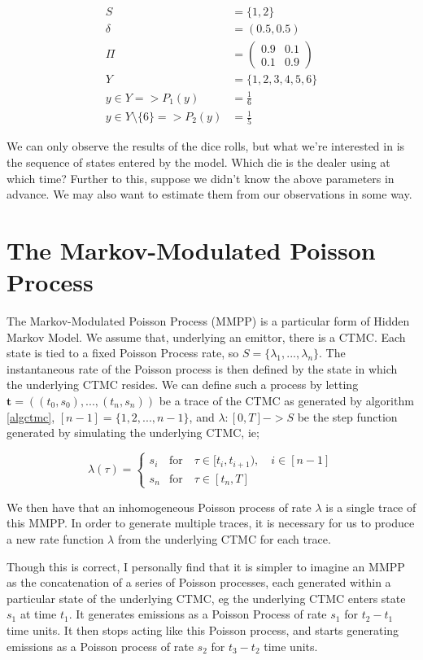 \begin{align*}
S &= \{1,2\}\\
\delta &= (0.5,0.5)\\
\Pi &= 
\left(
	\begin{matrix}
	0.9 & 0.1 \\
	0.1 & 0.9
	\end{matrix}
\right)\\
Y &= \{1,2,3,4,5,6\}\\
y \in Y => P_1(y) &= \frac{1}{6}\\
y \in Y \setminus \{6\} => P_2(y) &= \frac{1}{5}
\end{align*}

We can only observe the results of the dice rolls, but what we're interested in is the sequence of states entered by the model. Which die is the dealer using at which time? Further to this, suppose we didn't know the above parameters in advance. We may also want to estimate them from our observations in some way.

\section{The Markov-Modulated Poisson Process}\label{mmppdef}

The Markov-Modulated Poisson Process (MMPP) is a particular form of Hidden Markov Model. We assume that, underlying an emittor, there is a CTMC. Each state is tied to a fixed Poisson Process rate, so $S = \{\lambda_1,...,\lambda_n\}$. The instantaneous rate of the Poisson process is then defined by the state in which the underlying CTMC resides. We can define such a process by letting $\mathbf{t} = ((t_0,s_0),...,(t_n,s_n))$ be a trace of the CTMC as generated by algorithm \ref{algctmc}, $[n-1] = \{1,2,...,n-1\}$, and $\lambda : [0,T]->S$ be the step function generated by simulating the underlying CTMC, ie;

$$
\lambda(\tau) = 
\begin{cases}
	s_i & \mbox{for} \quad \tau \in [t_i,t_{i+1}), \quad i \in [n-1]\\
	s_n & \mbox{for} \quad \tau \in [t_n,T]
\end{cases}
$$

We then have that an inhomogeneous Poisson process of rate $\lambda$ is a single trace of this MMPP. In order to generate multiple traces, it is necessary for us to produce a new rate function $\lambda$ from the underlying CTMC for each trace.

Though this is correct, I personally find that it is simpler to imagine an MMPP as the concatenation of a series of Poisson processes, each generated within a particular state of the underlying CTMC, eg the underlying CTMC enters state $s_1$ at time $t_1$. It generates emissions as a Poisson Process of rate $s_1$ for $t_2-t_1$ time units. It then stops acting like this Poisson process, and starts generating emissions as a Poisson process of rate $s_2$ for $t_3-t_2$ time units.

